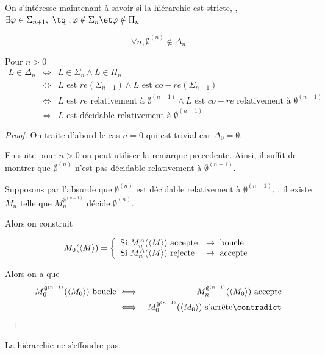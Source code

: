 On s'intéresse maintenant à savoir si la hiérarchie est stricte, \ie, $\exists \phi \in \Sigma_{n+1}, \text{ \tq }, \phi \notin \Sigma_n \et \phi \notin \Pi_n$.


\begin{prop}
	$$\forall n, \emptyset^{(n)} \notin \Delta_n$$
\end{prop}


\begin{remarque}
	Pour $n > 0$
	\begin{eqnarray*}
		L \in \Delta_n &\iff& L \in \Sigma_n \land L \in \Pi_n \\
		&\iff& L \text{ est } re(\Sigma_{n-1}) \land L \text{ est } co-re(\Sigma_{n-1})\\
		&\iff& L \text{ est } re \text{ relativement à } \emptyset^{(n-1)} \land  L \text{ est } co-re \text{ relativement à } \emptyset^{(n-1)} \\
		&\iff& L \text{ est décidable relativement à } \emptyset^{(n-1)}
	\end{eqnarray*}
\end{remarque}

\begin{proof}
	On traite d'abord le cas $n = 0$ qui est trivial car $\Delta_0 = \emptyset$.

	En suite pour $n > 0$ on peut utiliser la remarque precedente. Ainsi, il suffit de montrer que $\emptyset^{(n)}$ n'est pas décidable relativement à $\emptyset^{(n-1)}$.

	Supposons par l'absurde que $\emptyset^{(n)}$ est décidable relativement à $\emptyset^{(n-1)}$, \ie, il existe $M_n$ telle que $M_n^{\emptyset^{(n-1)}}$ décide $\emptyset^{(n)}$.

	Alors on construit

	$$
		M_0(\left\langle M\right\rangle) =
		\left\{
		\begin{array}{ll}
			\text{Si } M_n^A(\left\langle M\right\rangle) \text{ accepte} & \rightarrow \text{ boucle}  \\
			\text{Si } M_n^A(\left\langle M\right\rangle) \text{ rejecte} & \rightarrow \text{ accepte} \\
		\end{array}
		\right.
	$$

	Alors on a que
	\begin{eqnarray*}
		M_0^{\emptyset^{(n-1)}}(\encode{M_0}) \text{ boucle} &\iff& M_n^{\emptyset^{(n-1)}} (\encode {M_0}) \text{ accepte} \\
		&\iff& M_0^{\emptyset^{(n-1)}}(\encode{M_0}) \text{ s'arrête} \contradict
	\end{eqnarray*}
\end{proof}


\begin{coro}
	La hiérarchie ne s'effondre pas.
\end{coro}
